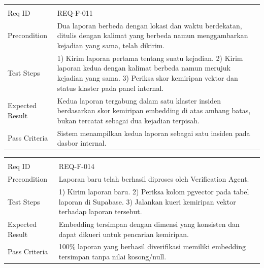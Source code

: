 \documentclass[11pt,a4paper]{article}
\begin{document}
\begin{longtable}{|L{2.6cm}|L{11.4cm}|}
\hline
{} \\ \hline
\endfirsthead
\hline
{} \\ \hline
\endhead
Req ID & REQ-F-011 \\ \hline
Precondition & Dua laporan berbeda dengan lokasi dan waktu berdekatan, ditulis dengan kalimat yang berbeda namun menggambarkan kejadian yang sama, telah dikirim. \\ \hline
Test Steps & 1) Kirim laporan pertama tentang suatu kejadian. 2) Kirim laporan kedua dengan kalimat berbeda namun merujuk kejadian yang sama. 3) Periksa skor kemiripan vektor dan status klaster pada panel internal. \\ \hline
Expected Result & Kedua laporan tergabung dalam satu klaster insiden berdasarkan skor kemiripan embedding di atas ambang batas, bukan tercatat sebagai dua kejadian terpisah. \\ \hline
Pass Criteria & Sistem menampilkan kedua laporan sebagai satu insiden pada dasbor internal. \\ \hline
\end{longtable}

\begin{longtable}{|L{2.6cm}|L{11.4cm}|}
\hline
{} \\ \hline
\endfirsthead
\hline
{} \\ \hline
\endhead
Req ID & REQ-F-014 \\ \hline
Precondition & Laporan baru telah berhasil diproses oleh Verification Agent. \\ \hline
Test Steps & 1) Kirim laporan baru. 2) Periksa kolom pgvector pada tabel laporan di Supabase. 3) Jalankan kueri kemiripan vektor terhadap laporan tersebut. \\ \hline
Expected Result & Embedding tersimpan dengan dimensi yang konsisten dan dapat dikueri untuk pencarian kemiripan. \\ \hline
Pass Criteria & 100\% laporan yang berhasil diverifikasi memiliki embedding tersimpan tanpa nilai kosong/null. \\ \hline
\end{longtable}
\end{document}
